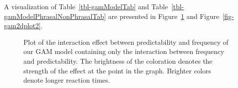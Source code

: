 \documentclass[
  authoryear,
  preprint,
  1p,
  onecolumn]{elsarticle}
\begin{document}
\begin{table}

\caption{\label{tbl-gamModelInterTab}Model results for the Generalized
Additive Mixed Model cotaining Frequency, Predictability, and the
interaction between them.}


\end{table}%

A visualization of Table~\ref{tbl-gamModelTab} and
Table~\ref{tbl-gamModelPhrasalNonPhrasalTab} are presented in
Figure~\ref{fig-gam2dplot1} and Figure~\ref{fig-gam2dplot2}.

\begin{figure}


\caption{\label{fig-gam2dplot1}Plot of the interaction effect between
predictability and frequency of our GAM model containing only the
interaction between frequency and predictability. The brightness of the
coloration denotes the strength of the effect at the point in the graph.
Brighter colors denote longer reaction times.}

\end{figure}%
\end{document}

